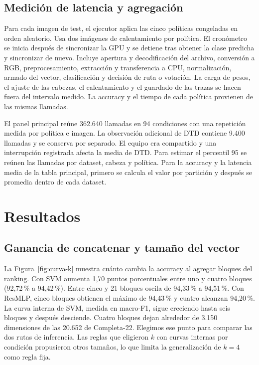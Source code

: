 \documentclass[a4paper,fleqn]{cas-sc}
\begin{document}
\FloatBarrier

\subsection{Medición de latencia y agregación}

Para cada imagen de test, el ejecutor aplica las cinco políticas congeladas en orden aleatorio. Usa dos imágenes de calentamiento por política. El cronómetro se inicia después de sincronizar la GPU y se detiene tras obtener la clase predicha y sincronizar de nuevo. Incluye apertura y decodificación del archivo, conversión a RGB, preprocesamiento, extracción y transferencia a CPU, normalización, armado del vector, clasificación y decisión de ruta o votación. La carga de pesos, el ajuste de las cabezas, el calentamiento y el guardado de las trazas se hacen fuera del intervalo medido. La accuracy y el tiempo de cada política provienen de las mismas llamadas.

El panel principal reúne 362.640 llamadas en 94 condiciones con una repetición medida por política e imagen. La observación adicional de DTD contiene 9.400 llamadas y se conserva por separado. El equipo era compartido y una interrupción registrada afecta la media de DTD. Para estimar el percentil 95 se reúnen las llamadas por dataset, cabeza y política. Para la accuracy y la latencia media de la tabla principal, primero se calcula el valor por partición y después se promedia dentro de cada dataset.

\section{Resultados}

\subsection{Ganancia de concatenar y tamaño del vector}

La Figura~\ref{fig:curva-k} muestra cuánto cambia la accuracy al agregar bloques del ranking. Con SVM aumenta 1,70 puntos porcentuales entre uno y cuatro bloques (92,72\,\% a 94,42\,\%). Entre cinco y 21 bloques oscila de 94,33\,\% a 94,51\,\%. Con ResMLP, cinco bloques obtienen el máximo de 94,43\,\% y cuatro alcanzan 94,20\,\%. La curva interna de SVM, medida en macro-F1, sigue creciendo hasta seis bloques y después desciende. Cuatro bloques dejan alrededor de 3.150 dimensiones de las 20.652 de Completa-22. Elegimos ese punto para comparar las dos rutas de inferencia. Las reglas que eligieron $k$ con curvas internas por condición propusieron otros tamaños, lo que limita la generalización de $k=4$ como regla fija.
\end{document}
